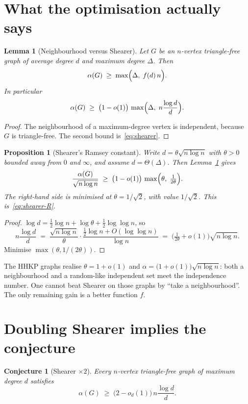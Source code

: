 \documentclass[11pt]{article}
\newtheorem{lemma}[theorem]{Lemma}
\newtheorem{proposition}[theorem]{Proposition}
\newtheorem{conjecture}[theorem]{Conjecture}
\theoremstyle{definition}
\begin{document}
\section{What the optimisation actually says}

\begin{lemma}[Neighbourhood versus Shearer]\label{lem:opt}
Let $G$ be an $n$-vertex triangle-free graph of average degree $d$ and maximum
degree $\Delta$. Then
\[
  \alpha(G)
  \;\ge\;
  \max\Bigl(\Delta,\; f(d)\,n\Bigr).
\]
In particular
\[
  \alpha(G)
  \;\ge\;
  \bigl(1-o(1)\bigr)\,
  \max\Bigl(\Delta,\; n\frac{\log d}{d}\Bigr).
\]
\end{lemma}

\begin{proof}
The neighbourhood of a maximum-degree vertex is independent, because $G$ is
triangle-free. The second bound is~\eqref{eq:shearer}.
\end{proof}

\begin{proposition}[Shearer's Ramsey constant]\label{prop:opt}
Write $d=\theta\sqrt{n\log n}$ with $\theta>0$ bounded away from $0$ and
$\infty$, and assume $d=\Theta(\Delta)$. Then Lemma~\ref{lem:opt} gives
\[
  \frac{\alpha(G)}{\sqrt{n\log n}}
  \;\ge\;
  \bigl(1-o(1)\bigr)\,
  \max\Bigl(\theta,\;\tfrac{1}{2\theta}\Bigr).
\]
The right-hand side is minimised at $\theta=1/\sqrt{2}$, with value $1/\sqrt{2}$.
This is~\eqref{eq:shearer-R}.
\end{proposition}

\begin{proof}
$\log d=\tfrac12\log n+\log\theta+\tfrac12\log\log n$, so
\[
  n\frac{\log d}{d}
  \;=\;
  \frac{\sqrt{n\log n}}{\theta}
  \cdot
  \frac{\tfrac12\log n+O(\log\log n)}{\log n}
  \;=\;
  \bigl(\tfrac{1}{2\theta}+o(1)\bigr)\sqrt{n\log n}.
\]
Minimise $\max(\theta,1/(2\theta))$.
\end{proof}

The HHKP graphs realise $\theta=1+o(1)$ and $\alpha=\bigl(1+o(1)\bigr)\sqrt{n\log n}$:
both a neighbourhood and a random-like independent set meet the independence
number. One cannot beat Shearer on those graphs by ``take a neighbourhood''.
The only remaining gain is a better function $f$.

\section{Doubling Shearer implies the conjecture}

\begin{conjecture}[Shearer $\times 2$]\label{conj:double}
Every $n$-vertex triangle-free graph of maximum degree $d$ satisfies
\[
  \alpha(G)\;\ge\;\bigl(2-o_d(1)\bigr)\,n\frac{\log d}{d}.
\]
\end{conjecture}
\end{document}
